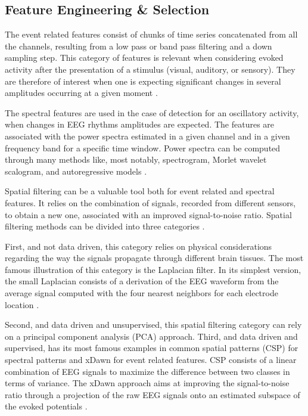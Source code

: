 \documentclass[../../../main.tex]{subfiles}
\begin{document}
\subsection{Feature Engineering \& Selection}

The event related features consist of chunks of time series concatenated from all the channels, resulting from a low pass or band pass filtering and a down sampling step. This category of features is relevant when considering evoked activity after the presentation of a stimulus (visual, auditory, or sensory). They are therefore of interest when one is expecting significant changes in several amplitudes occurring at a given moment \cite{Corsi2023}.

The spectral features are used in the case of detection for an oscillatory activity, when changes in EEG rhythms amplitudes are expected. The features are associated with the power spectra estimated in a given channel and in a given frequency band for a specific time window. Power spectra can be computed through many methods like, most notably, spectrogram, Morlet wavelet scalogram, and autoregressive models \cite{Corsi2023}.

Spatial filtering can be a valuable tool both for event related and spectral features. It relies on the combination of signals, recorded from different sensors, to obtain a new one, associated with an improved signal-to-noise ratio. Spatial filtering methods can be divided into three categories \cite{Corsi2023}.

First, and not data driven, this category relies on physical considerations regarding the way the signals propagate through different brain tissues. The most famous illustration of this category is the Laplacian filter. In its simplest version, the small Laplacian consists of a derivation of the EEG waveform from the average signal computed with the four nearest neighbors for each electrode location \cite{Corsi2023}.

Second, and data driven and unsupervised, this spatial filtering category can rely on a principal component analysis (PCA) approach. Third, and data driven and supervised, has its most famous examples in common spatial patterns (CSP) for spectral patterns and xDawn for event related features. CSP consists of a linear combination of EEG signals to maximize the difference between two classes in terms of variance. The xDawn approach aims at improving the signal-to-noise ratio through a projection of the raw EEG signals onto an estimated subspace of the evoked potentials \cite{Corsi2023}.
\end{document}
